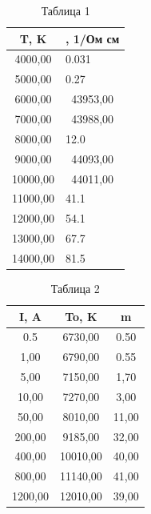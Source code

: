 \documentclass[12pt,a4paper]{scrartcl}
\begin{document}
	\begin{table}[H]
		\centering
		\caption{Таблица 1}
		\begin{tabular}{|c|p{4.215em}|}
			\toprule
			\multicolumn{1}{|p{4.215em}|}{T, K} & , 1/Ом см \\
			\midrule
			4000,00 & 0.031 \\
			\midrule
			5000,00 & 0.27 \\
			\midrule
			6000,00 & \multicolumn{1}{c|}{43953,00} \\
			\midrule
			7000,00 & \multicolumn{1}{c|}{43988,00} \\
			\midrule
			8000,00 & 12.0 \\
			\midrule
			9000,00 & \multicolumn{1}{c|}{44093,00} \\
			\midrule
			10000,00 & \multicolumn{1}{c|}{44011,00} \\
			\midrule
			11000,00 & 41.1 \\
			\midrule
			12000,00 & 54.1 \\
			\midrule
			13000,00 & 67.7 \\
			\midrule
			14000,00 & 81.5 \\
			\bottomrule
		\end{tabular}%
		\label{tab:l}%
	\end{table}%

	\begin{table}[H]
		\centering
		\caption{Таблица 2}
		\begin{tabular}{|c|c|c|}
			\toprule
			\multicolumn{1}{|p{4.215em}|}{I, A} & \multicolumn{1}{p{4.215em}|}{To, K} & \multicolumn{1}{p{4.215em}|}{m} \\
			\midrule
			\multicolumn{1}{|p{4.215em}|}{0.5} & 6730,00 & \multicolumn{1}{p{4.215em}|}{0.50} \\
			\midrule
			1,00  & 6790,00 & \multicolumn{1}{p{4.215em}|}{0.55} \\
			\midrule
			5,00  & 7150,00 & 1,70 \\
			\midrule
			10,00 & 7270,00 & 3,00 \\
			\midrule
			50,00 & 8010,00 & 11,00 \\
			\midrule
			200,00 & 9185,00 & 32,00 \\
			\midrule
			400,00 & 10010,00 & 40,00 \\
			\midrule
			800,00 & 11140,00 & 41,00 \\
			\midrule
			1200,00 & 12010,00 & 39,00 \\
			\bottomrule
		\end{tabular}%
		\label{tab:2}%
	\end{table}%
\end{document}
